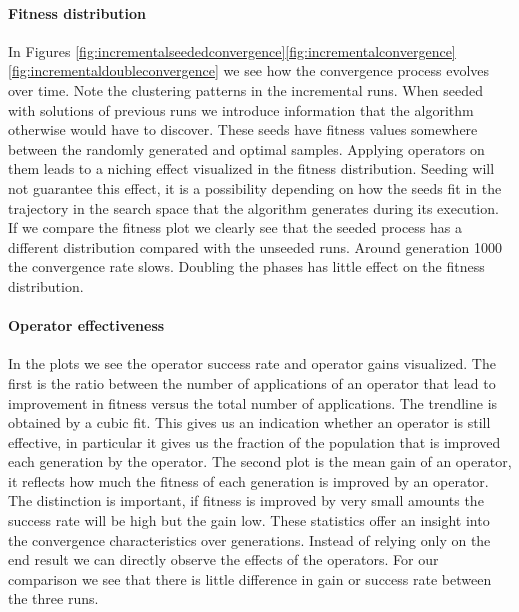 \paragraph{Fitness distribution}
In Figures \ref{fig:incrementalseededconvergence}\ref{fig:incrementalconvergence}\ref{fig:incrementaldoubleconvergence} we see how the convergence process evolves over time. 
Note the clustering patterns in the incremental runs. When seeded with solutions of previous runs we introduce information that the algorithm otherwise would have to discover. These seeds have fitness values somewhere between the randomly generated and optimal samples. Applying operators on them leads to a niching effect visualized in the fitness distribution. Seeding will not guarantee this effect, it is a possibility depending on how the seeds fit in the trajectory in the search space that the algorithm generates during its execution.
If we compare the fitness plot we clearly see that the seeded process has a different distribution compared with the unseeded runs. Around generation 1000 the convergence rate slows. Doubling the phases has little effect on the fitness distribution. 
\paragraph{Operator effectiveness}
In the plots we see the operator success rate and operator gains visualized. The first is the ratio between the number of applications of an operator that lead to improvement in fitness versus the total number of applications. The trendline is obtained by a cubic fit. This gives us an indication whether an operator is still effective, in particular it gives us the fraction of the population that is improved each generation by the operator. The second plot is the mean gain of an operator, it reflects how much the fitness of each generation is improved by an operator. The distinction is important, if fitness is improved by very small amounts the success rate will be high but the gain low. These statistics offer an insight into the convergence characteristics over generations. Instead of relying only on the end result we can directly observe the effects of the operators. For our comparison we see that there is little difference in gain or success rate between the three runs.
